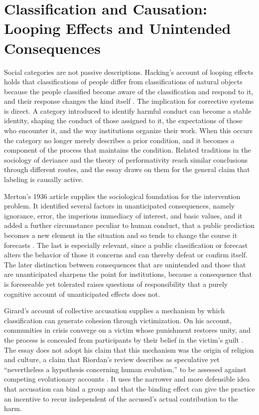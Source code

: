 \documentclass[12pt]{article}
\theoremstyle{remark}
\begin{document}
\section{Classification and Causation: Looping Effects and Unintended Consequences}
\label{sec:class}

Social categories are not passive descriptions. Hacking's account of looping effects holds that classifications of people differ from classifications of natural objects because the people classified become aware of the classification and respond to it, and their response changes the kind itself \cite{hacking1995}. The implication for corrective systems is direct. A category introduced to identify harmful conduct can become a stable identity, shaping the conduct of those assigned to it, the expectations of those who encounter it, and the way institutions organize their work. When this occurs the category no longer merely describes a prior condition, and it becomes a component of the process that maintains the condition. Related traditions in the sociology of deviance and the theory of performativity reach similar conclusions through different routes, and the essay draws on them for the general claim that labeling is causally active.

Merton's 1936 article supplies the sociological foundation for the intervention problem. It identified several factors in unanticipated consequences, namely ignorance, error, the imperious immediacy of interest, and basic values, and it added a further circumstance peculiar to human conduct, that a public prediction becomes a new element in the situation and so tends to change the course it forecasts \cite{merton1936}. The last is especially relevant, since a public classification or forecast alters the behavior of those it concerns and can thereby defeat or confirm itself. The later distinction between consequences that are unintended and those that are unanticipated \cite{dezwart2015} sharpens the point for institutions, because a consequence that is foreseeable yet tolerated raises questions of responsibility that a purely cognitive account of unanticipated effects does not.

Girard's account of collective accusation supplies a mechanism by which classification can generate cohesion through victimization. On his account, communities in crisis converge on a victim whose punishment restores unity, and the process is concealed from participants by their belief in the victim's guilt \cite{girard1977,girard1986}. The essay does not adopt his claim that this mechanism was the origin of religion and culture, a claim that Riordan's review describes as speculative yet ``nevertheless a hypothesis concerning human evolution,'' to be assessed against competing evolutionary accounts \cite{riordan2021}. It uses the narrower and more defensible idea that accusation can bind a group and that the binding effect can give the practice an incentive to recur independent of the accused's actual contribution to the harm.
\end{document}
